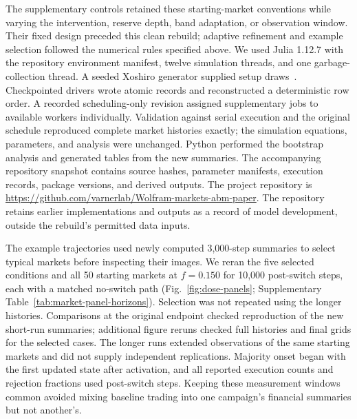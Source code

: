 The supplementary controls retained these starting-market conventions
while varying the intervention, reserve depth, band adaptation, or
observation window. Their fixed design preceded this clean rebuild;
adaptive refinement and example selection followed the numerical rules
specified above. We used Julia 1.12.7 with the repository environment
manifest, twelve simulation threads, and one garbage-collection thread.
A seeded Xoshiro generator supplied setup draws~\cite{blackman2021scrambled}.
Checkpointed drivers wrote atomic records and reconstructed a deterministic
row order. A recorded scheduling-only revision assigned supplementary jobs
to available workers individually. Validation against serial execution
and the original schedule reproduced complete market histories exactly;
the simulation equations, parameters, and analysis were unchanged. Python performed the bootstrap analysis and generated tables
from the new summaries. The accompanying repository snapshot contains source hashes, parameter
manifests, execution records, package versions, and derived outputs.
The project repository is
\url{https://github.com/varnerlab/Wolfram-markets-abm-paper}.
The repository retains earlier implementations and outputs as a record
of model development, outside the rebuild's permitted data inputs.

The example trajectories used newly computed 3,000-step summaries to
select typical markets before inspecting their images. We reran the five
selected conditions and all 50 starting markets at $f=0.150$ for 10,000
post-switch steps, each with a matched no-switch path
(Fig.~\ref{fig:dose-panels}; Supplementary Table~\ref{tab:market-panel-horizons}).
Selection was not repeated using the longer histories. Comparisons at the
original endpoint checked reproduction of the new short-run summaries;
additional figure reruns checked full histories and final grids for the
selected cases. The longer runs extended observations of the same
starting markets and did not supply independent replications. Majority
onset began with the first updated state after activation, and all
reported execution counts and rejection fractions used post-switch
steps. Keeping these measurement windows common avoided mixing baseline
trading into one campaign's financial summaries but not another's.



